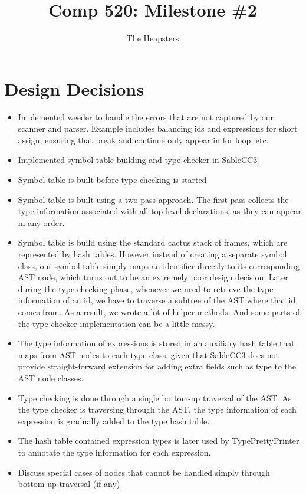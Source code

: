 \documentclass{article}
\title{Comp 520: Milestone \#2}
\author{The Heapsters}
\date{}
\begin{document}
\maketitle

\section*{Design Decisions}

\begin{itemize}
\item Implemented weeder to handle the errors that are not captured by our scanner and parser. Example includes balancing ids and expressions for short assign, ensuring that break and continue only appear in for loop, etc.
\item Implemented symbol table building and type checker in SableCC3
\item Symbol table is built before type checking is started
\item Symbol table is built using a two-pass approach. The first pass collects the type information associated with all top-level declarations, as they can appear in any order.
\item Symbol table is build using the standard cactus stack of frames, which are represented by hash tables. However instead of creating a separate symbol class, our symbol table simply maps an identifier directly to its corresponding AST node, which turns out to be an extremely poor design decision. Later during the type checking phase, whenever we need to retrieve the type information of an id, we have to traverse a subtree of the AST where that id comes from. As a result, we wrote a lot of helper methods. And some parts of the type checker implementation can be a little messy.
\item The type information of expressions is stored in an auxiliary hash table that maps from AST nodes to each type class, given that SableCC3 does not provide straight-forward extension for adding extra fields such as type to the AST node classes.
\item Type checking is done through a single bottom-up traversal of the AST. As the type checker is traversing through the AST, the type information of each expression is gradually added to the type hash table.
\item The hash table contained expression types is later used by TypePrettyPrinter to annotate the type information for each expression.
\item Discuss special cases of nodes that cannot be handled simply through bottom-up traversal (if any)
\end{itemize}
\end{document}
